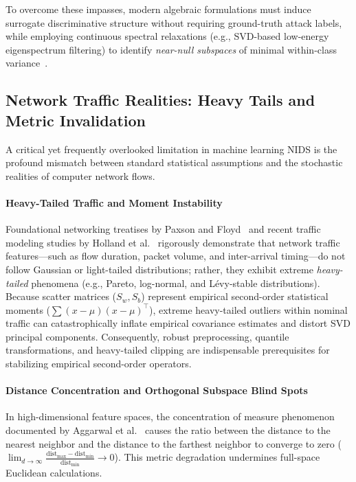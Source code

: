 To overcome these impasses, modern algebraic formulations must induce surrogate discriminative structure without requiring ground-truth attack labels, while employing continuous spectral relaxations (e.g., SVD-based low-energy eigenspectrum filtering) to identify \emph{near-null subspaces} of minimal within-class variance~\cite{golestani2024exploring,aktar2024robust}.

\subsection{Network Traffic Realities: Heavy Tails and Metric Invalidation}
\label{subsec:rel_traffic_realities}

A critical yet frequently overlooked limitation in machine learning NIDS is the profound mismatch between standard statistical assumptions and the stochastic realities of computer network flows. 

\paragraph{Heavy-Tailed Traffic and Moment Instability}
Foundational networking treatises by Paxson and Floyd~\cite{paxson1995wide} and recent traffic modeling studies by Holland et al.~\cite{holland2021new} rigorously demonstrate that network traffic features---such as flow duration, packet volume, and inter-arrival timing---do not follow Gaussian or light-tailed distributions; rather, they exhibit extreme \emph{heavy-tailed} phenomena (e.g., Pareto, log-normal, and Lévy-stable distributions). Because scatter matrices ($S_w, S_b$) represent empirical second-order statistical moments ($\sum (x - \mu)(x - \mu)^\top$), extreme heavy-tailed outliers within nominal traffic can catastrophically inflate empirical covariance estimates and distort SVD principal components. Consequently, robust preprocessing, quantile transformations, and heavy-tailed clipping are indispensable prerequisites for stabilizing empirical second-order operators.

\paragraph{Distance Concentration and Orthogonal Subspace Blind Spots}
In high-dimensional feature spaces, the concentration of measure phenomenon documented by Aggarwal et al.~\cite{aggarwal2001surprising} causes the ratio between the distance to the nearest neighbor and the distance to the farthest neighbor to converge to zero ($\lim_{d \to \infty} \frac{\text{dist}_{\max} - \text{dist}_{\min}}{\text{dist}_{\min}} \to 0$). This metric degradation undermines full-space Euclidean calculations. 

